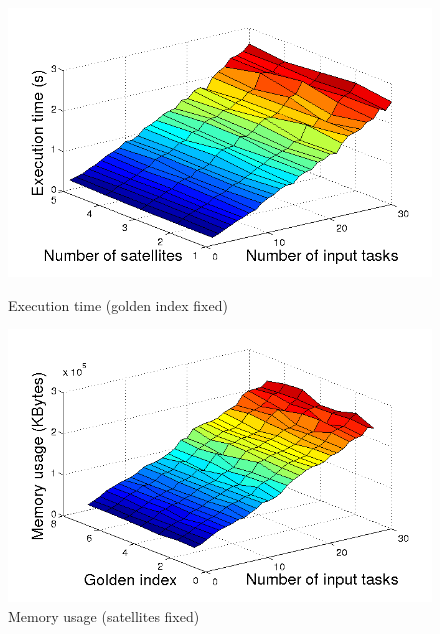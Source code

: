 \begin{figure}[ht]
  \begin{minipage}[b]{0.5\linewidth}
    \includegraphics[width=\linewidth]{Figures/tLG_goldenfix.png}
    \caption{Execution time (golden index fixed)}\label{fig_tLG_goldenfix}
  \end{minipage}
    \begin{minipage}[b]{0.5\linewidth}
    \includegraphics[width=\linewidth]{Figures/mLG_satsfix.png}
    \caption{Memory usage (satellites fixed)}\label{fig_mLG_satsfix}
  \end{minipage}
  

\end{figure}
